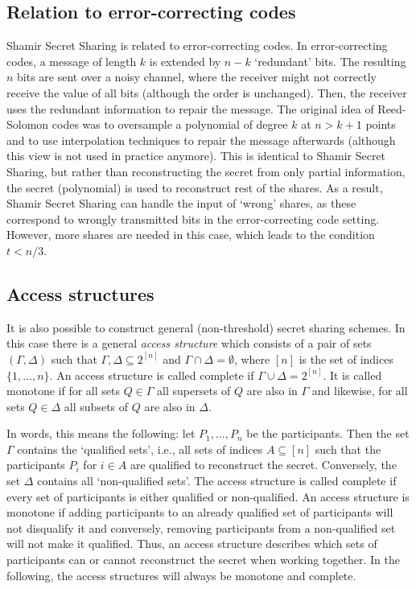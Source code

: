 \documentclass[11pt]{article}
\begin{document}
\subsection*{Relation to error-correcting codes}
Shamir Secret Sharing is related to error-correcting codes. In error-correcting codes, a message of length $k$ is extended by $n-k$ `redundant' bits. The resulting $n$ bits are sent over a noisy channel, where the receiver might not correctly receive the value of all bits (although the order is unchanged). Then, the receiver uses the redundant information to repair the message. The original idea of Reed-Solomon codes was to oversample a polynomial of degree $k$ at $n > k+1$ points and to use interpolation techniques to repair the message afterwards (although this view is not used in practice anymore). This is identical to Shamir Secret Sharing, but rather than reconstructing the secret from only partial information, the secret (polynomial) is used to reconstruct rest of the shares. As a result, Shamir Secret Sharing can handle the input of `wrong' shares, as these correspond to wrongly transmitted bits in the error-correcting code setting. However, more shares are needed in this case, which leads to the condition $t < n/3$. 

\subsection*{Access structures}
It is also possible to construct general (non-threshold) secret sharing schemes. In this case there is a general {\it access structure} which consists of a pair of sets $(\Gamma,\Delta)$ such that $\Gamma,\Delta \subseteq 2^{[n]}$ and $\Gamma \cap \Delta = \emptyset$, where $[n]$ is the set of indices $\{1,\ldots,n\}$. An access structure is called complete if $\Gamma \cup \Delta = 2^{[n]}$. It is called monotone if for all sets $Q\in\Gamma$ all supersets of $Q$ are also in $\Gamma$ and likewise, for all sets $Q\in\Delta$ all subsets of $Q$ are also in $\Delta$. 

In words, this means the following: let $P_1, \ldots, P_n$ be the participants. Then the set $\Gamma$ contains the `qualified sets', i.e., all sets of indices $A\subseteq[n]$ such that the participants $P_i$ for $i\in A$ are qualified to reconstruct the secret. Conversely, the set $\Delta$ contains all `non-qualified sets'. The access structure is called complete if every set of participants is either qualified or non-qualified. An access structure is monotone if adding participants to an already qualified set of participants will not disqualify it and conversely, removing participants from a non-qualified set will not make it qualified. Thus, an access structure describes which sets of participants can or cannot reconstruct the secret when working together. In the following, the access structures will always be monotone and complete.
\end{document}
